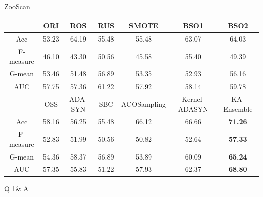 \documentclass[10pt]{beamer}
\begin{document}
\begin{frame}{ZooScan}

\begin{table}[!h]
  	\centering
      \scriptsize
	\begin{tabular}{c|c|c|c|c|c|c}
    \toprule[1.5pt]
    \hline
    			&ORI	&ROS	&RUS	&SMOTE	&BSO1	&BSO2	\\ 
	\hline
    Acc			&53.23	&64.19	&55.48	&55.48	&63.07	&64.03	\\
    \hline
     F-measure	&46.10	&43.30	&50.56	&45.58	&55.40	&49.39\\
	\hline
    G-mean		&53.46	&51.48	&56.89	&53.35	&52.93	&56.16	\\
	\hline
    AUC			&57.75	&57.36	&61.22	&57.92	&58.14	&59.78\\

        \midrule[1.2pt]

                &OSS	&ADA-SYN	&SBC	&ACOSampling	&Kernel-ADASYN	&KA-Ensemble\\
	\hline
    Acc			&58.16	&56.25		&55.48	&66.12			&66.66			&\textbf{71.26}	\\
    \hline
     F-measure	&52.83	&51.99		&50.56	&50.82			&52.64			&\textbf{57.33}\\
	\hline
    G-mean		&54.36	&58.37		&56.89	&53.89			&60.09			&\textbf{65.24}	\\
	\hline
    AUC			&57.35	&55.83		&51.22	&57.93			&62.37			&\textbf{68.80}\\
    	\hline
\bottomrule[1.2pt]
    \end{tabular}
    \label{result4}    
\end{table}

\end{frame}


\begin{frame}
\centering\Huge\textsc{Q 1\& A}
\end{frame}
\end{document}
